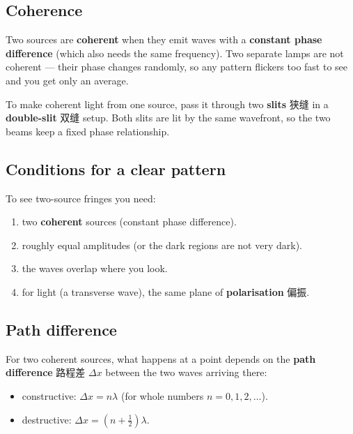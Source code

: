 \documentclass[11pt]{article}
\begin{document}
\subsection*{Coherence}

Two sources are \textbf{coherent} when they emit waves with a \textbf{constant phase difference} (which also needs the same frequency). Two separate lamps are not coherent — their phase changes randomly, so any pattern flickers too fast to see and you get only an average.

To make coherent light from one source, pass it through two \textbf{slits} 狭缝 in a \textbf{double-slit} 双缝 setup. Both slits are lit by the same wavefront, so the two beams keep a fixed phase relationship.

\subsection*{Conditions for a clear pattern}

To see two-source fringes you need:

\begin{enumerate}
\item two \textbf{coherent} sources (constant phase difference).

\item roughly equal amplitudes (or the dark regions are not very dark).

\item the waves overlap where you look.

\item for light (a transverse wave), the same plane of \textbf{polarisation} 偏振.

\end{enumerate}

\subsection*{Path difference}

For two coherent sources, what happens at a point depends on the \textbf{path difference} 路程差 $\Delta x$ between the two waves arriving there:

\begin{itemize}
\item constructive: $\Delta x = n\lambda$ (for whole numbers $n = 0, 1, 2, \ldots$).

\item destructive: $\Delta x = (n + \tfrac{1}{2})\lambda$.

\end{itemize}
\end{document}
